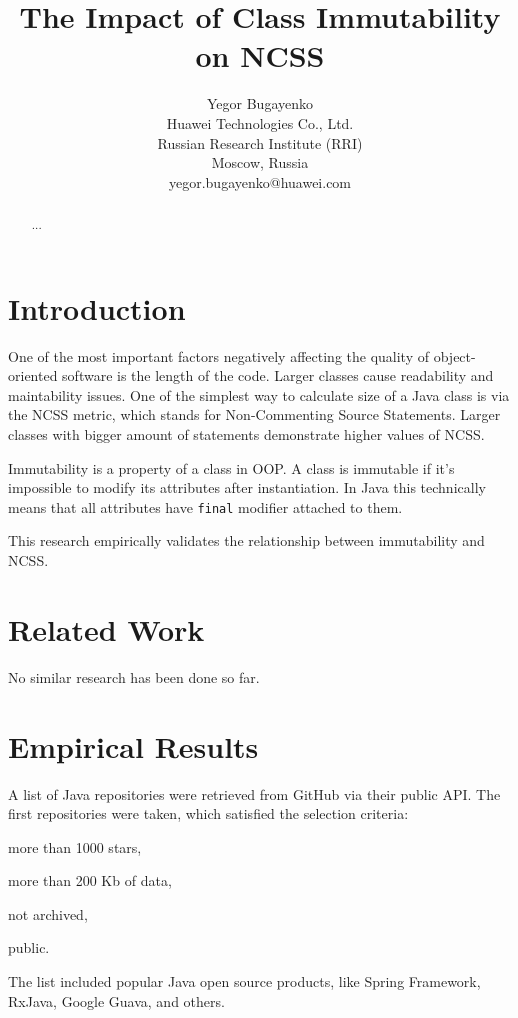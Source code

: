 \documentclass[12pt]{article}
\title{The Impact of Class Immutability on NCSS}
\author{Yegor Bugayenko\\Huawei Technologies Co., Ltd.\\Russian Research Institute (RRI)\\Moscow, Russia\\yegor.bugayenko@huawei.com}{}{}
\begin{document}
\raggedbottom
\maketitle

\begin{abstract}
...
\end{abstract}

\section{Introduction}

One of the most important factors negatively affecting the quality
of object-oriented software is the length of the code. Larger classes
cause readability and maintability issues. One of the simplest way
to calculate size of a Java class is via the NCSS metric, which
stands for Non-Commenting Source Statements. Larger classes with bigger
amount of statements demonstrate higher values of NCSS.

Immutability is a property of a class in OOP. A class is immutable if
it's impossible to modify its attributes after instantiation. In Java this
technically means that all attributes have \texttt{final} modifier attached
to them.

This research empirically validates the relationship between immutability
and NCSS.

\section{Related Work}

No similar research has been done so far.

\section{Empirical Results}

A list of Java repositories were retrieved from GitHub via their
public API. The first \totalrepos{} repositories were taken, which satisfied
the selection criteria:
\begin{enumerate*}[label={\arabic*)}]
\item more than 1000 stars,
\item more than 200 Kb of data,
\item not archived,
\item public.
\end{enumerate*}
The list included popular Java open source products, like
Spring Framework, RxJava, Google Guava, and others.
\end{document}
